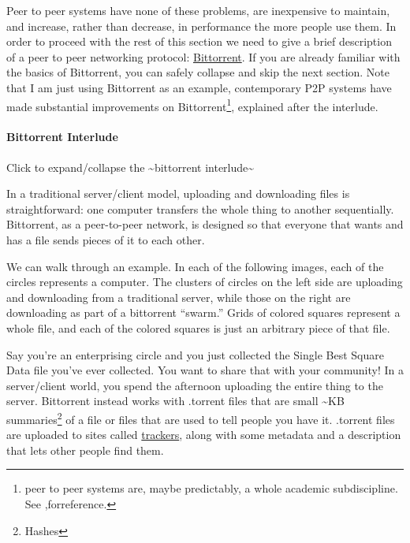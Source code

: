 \documentclass{article}
\begin{document}
Peer to peer systems have none of these problems, are inexpensive to
maintain, and increase, rather than decrease, in performance the more
people use them. In order to proceed with the rest of this section we
need to give a brief description of a peer to peer networking protocol:
\href{https://en.wikipedia.org/wiki/BitTorrent}{Bittorrent}. If you are
already familiar with the basics of Bittorrent, you can safely collapse
and skip the next section. Note that I am just using Bittorrent as an
example, contemporary P2P systems have made substantial improvements on
Bittorrent\footnote{peer to peer systems are, maybe predictably, a whole
  academic subdiscipline. See \cite{shenHandbookPeertoPeerNetworking2010},forreference.}, explained
after the interlude.

\hypertarget{bittorrent-interlude}{%
\paragraph{Bittorrent Interlude}\label{bittorrent-interlude}}

Click to expand/collapse the \textasciitilde bittorrent
interlude\textasciitilde{}

In a traditional server/client model, uploading and downloading files is
straightforward: one computer transfers the whole thing to another
sequentially. Bittorrent, as a peer-to-peer network, is designed so that
everyone that wants and has a file sends pieces of it to each other.

We can walk through an example. In each of the following images, each of
the circles represents a computer. The clusters of circles on the left
side are uploading and downloading from a traditional server, while
those on the right are downloading as part of a bittorrent ``swarm.''
Grids of colored squares represent a whole file, and each of the colored
squares is just an arbitrary piece of that file.

Say you're an enterprising circle and you just collected the Single Best
Square Data file you've ever collected. You want to share that with your
community! In a server/client world, you spend the afternoon uploading
the entire thing to the server. Bittorrent instead works with .torrent
files that are small \textasciitilde KB summaries\footnote{Hashes} of a
file or files that are used to tell people you have it. .torrent files
are uploaded to sites called
\href{https://en.wikipedia.org/wiki/BitTorrent_tracker}{trackers}, along
with some metadata and a description that lets other people find them.
\end{document}
